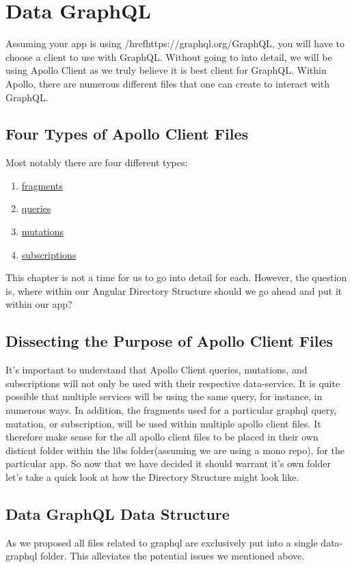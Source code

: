 \chapter{ Data GraphQL }


Assuming your app is using /href{https://graphql.org/}{GraphQL}, you will have
to choose a client to use with GraphQL. Without going to into detail, we will be
using Apollo Client as we truly believe it is best client for GraphQL. Within
Apollo, there are numerous different files that one can create to interact
with GraphQL.

\section{Four Types of Apollo Client Files}
Most notably there are four different types:
\begin{enumerate}
  \item \href{https://www.apollographql.com/docs/angular/features/fragments}{fragments}
  \item \href{https://www.apollographql.com/docs/angular/basics/queries/}{queries}
  \item \href{https://www.apollographql.com/docs/angular/basics/mutations}{mutations}
  \item \href{https://www.apollographql.com/docs/angular/features/subscriptions}{subscriptions}
\end{enumerate}

This chapter is not a time for us to go into detail for each. However, the
question is, where within our Angular Directory Structure should we go ahead and
put it within our app?

\section{Dissecting the Purpose of Apollo Client Files}
It's important to understand that Apollo Client queries, mutations, and
subscriptions will not only be used with their respective data-service. It is
quite possible that multiple services will be using the same query, for
instance, in numerous ways. In addition, the fragments used for a particular
graphql query, mutation, or subscription, will be used within multiple apollo
client files. It therefore make sense for the all apollo client files to be
placed in their own disticnt folder within the libs folder(assuming we are using
a mono repo), for the particular app. So now that we have decided it should
warrant it's own folder let's take a quick look at how the Directory Structure
might look like.

\section{Data GraphQL Data Structure}


As we proposed all files related to graphql are exclusively put into a single
data-graphql folder. This alleviates the potential issues we mentioned above.
